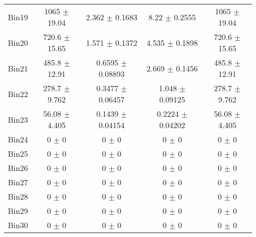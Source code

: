 \begin{tabular}{@{\extracolsep{4pt}}lcccc@{}}
     Bin19 & 1065 $\pm$ 19.04 & 2.362 $\pm$ 0.1683 & 8.22 $\pm$ 0.2555 & 1065 $\pm$ 19.04 \\ 
     Bin20 & 720.6 $\pm$ 15.65 & 1.571 $\pm$ 0.1372 & 4.535 $\pm$ 0.1898 & 720.6 $\pm$ 15.65 \\ 
     Bin21 & 485.8 $\pm$ 12.91 & 0.6595 $\pm$ 0.08893 & 2.669 $\pm$ 0.1456 & 485.8 $\pm$ 12.91 \\ 
     Bin22 & 278.7 $\pm$ 9.762 & 0.3477 $\pm$ 0.06457 & 1.048 $\pm$ 0.09125 & 278.7 $\pm$ 9.762 \\ 
     Bin23 & 56.08 $\pm$ 4.405 & 0.1439 $\pm$ 0.04154 & 0.2224 $\pm$ 0.04202 & 56.08 $\pm$ 4.405 \\ 
     Bin24 & 0 $\pm$ 0 & 0 $\pm$ 0 & 0 $\pm$ 0 & 0 $\pm$ 0 \\ 
     Bin25 & 0 $\pm$ 0 & 0 $\pm$ 0 & 0 $\pm$ 0 & 0 $\pm$ 0 \\ 
     Bin26 & 0 $\pm$ 0 & 0 $\pm$ 0 & 0 $\pm$ 0 & 0 $\pm$ 0 \\ 
     Bin27 & 0 $\pm$ 0 & 0 $\pm$ 0 & 0 $\pm$ 0 & 0 $\pm$ 0 \\ 
     Bin28 & 0 $\pm$ 0 & 0 $\pm$ 0 & 0 $\pm$ 0 & 0 $\pm$ 0 \\ 
     Bin29 & 0 $\pm$ 0 & 0 $\pm$ 0 & 0 $\pm$ 0 & 0 $\pm$ 0 \\ 
     Bin30 & 0 $\pm$ 0 & 0 $\pm$ 0 & 0 $\pm$ 0 & 0 $\pm$ 0 \\ 
\hline\hline
  \end{tabular}
